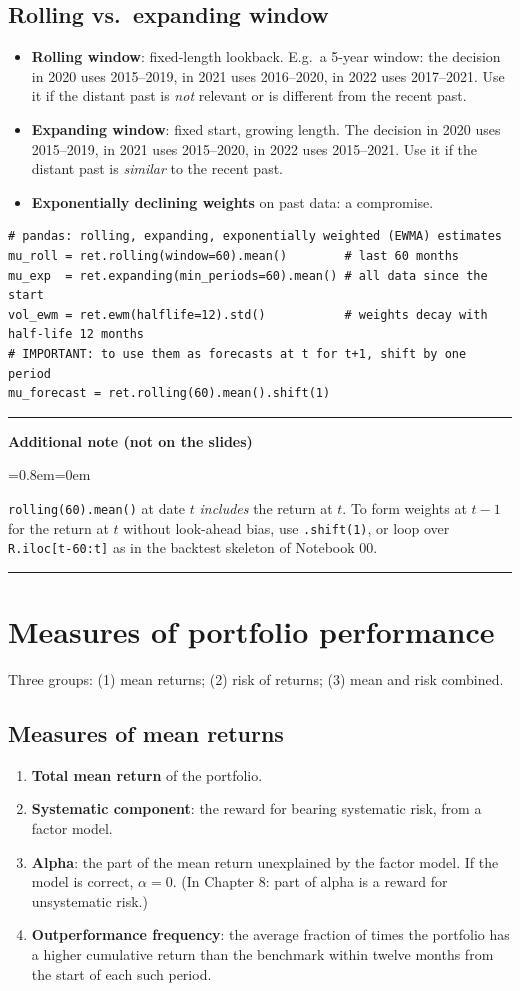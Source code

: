 \documentclass[11pt,a4paper]{report}
\newenvironment{notebox}[1]
  {\par\medskip\Needspace{6\baselineskip}\noindent\rule{\linewidth}{0.4pt}\par\nopagebreak
   \noindent\textbf{#1}\par\nopagebreak
   \begin{list}{}{\leftmargin=0.8em\rightmargin=0em\topsep=2pt}\item[]}
  {\end{list}\nopagebreak\noindent\rule{\linewidth}{0.4pt}\par\medskip}
\newenvironment{addnote}{\begin{notebox}{Additional note (not on the slides)}}{\end{notebox}}
\begin{document}
\subsection{Rolling vs.\ expanding window}
\begin{itemize}
  \item \textbf{Rolling window}: fixed-length lookback. E.g.\ a 5-year window: the
    decision in 2020 uses 2015--2019, in 2021 uses 2016--2020, in 2022 uses 2017--2021.
    Use it if the distant past is \emph{not} relevant or is different from the recent past.
  \item \textbf{Expanding window}: fixed start, growing length. The decision in
    2020 uses 2015--2019, in 2021 uses 2015--2020, in 2022 uses 2015--2021.
    Use it if the distant past is \emph{similar} to the recent past.
  \item \textbf{Exponentially declining weights} on past data: a compromise.
\end{itemize}
\begin{lstlisting}
# pandas: rolling, expanding, exponentially weighted (EWMA) estimates
mu_roll = ret.rolling(window=60).mean()        # last 60 months
mu_exp  = ret.expanding(min_periods=60).mean() # all data since the start
vol_ewm = ret.ewm(halflife=12).std()           # weights decay with half-life 12 months
# IMPORTANT: to use them as forecasts at t for t+1, shift by one period
mu_forecast = ret.rolling(60).mean().shift(1)
\end{lstlisting}
\begin{addnote}
\texttt{rolling(60).mean()} at date $t$ \emph{includes} the return at $t$.
To form weights at $t-1$ for the return at $t$ without look-ahead bias, use
\texttt{.shift(1)}, or loop over \texttt{R.iloc[t-60:t]} as in the backtest
skeleton of Notebook 00.
\end{addnote}

\section{Measures of portfolio performance}
Three groups: (1) mean returns; (2) risk of returns; (3) mean and risk combined.

\subsection{Measures of mean returns}
\begin{enumerate}
  \item \textbf{Total mean return} of the portfolio.
  \item \textbf{Systematic component}: the reward for bearing systematic risk, from a factor model.
  \item \textbf{Alpha}: the part of the mean return unexplained by the factor
    model. If the model is correct, $\alpha=0$. (In Chapter 8: part of alpha
    is a reward for unsystematic risk.)
  \item \textbf{Outperformance frequency}: the average fraction of times the
    portfolio has a higher cumulative return than the benchmark within twelve
    months from the start of each such period.
\end{enumerate}
\end{document}
